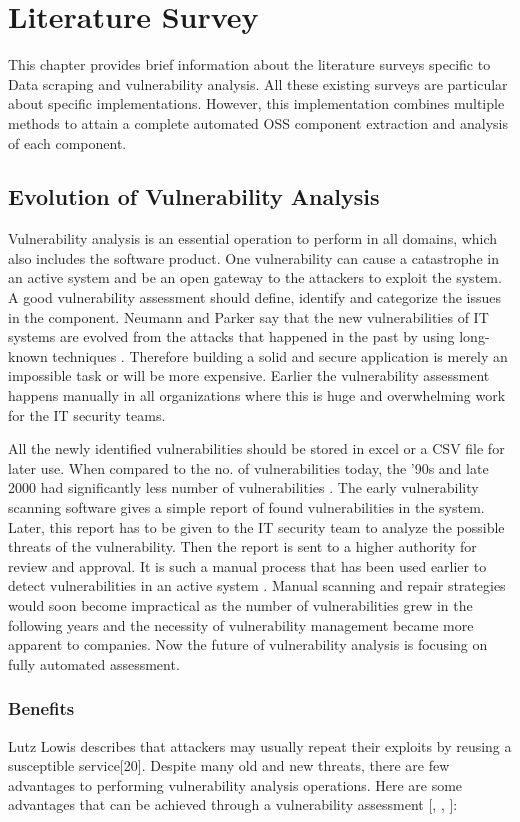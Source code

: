 %
\section{Literature Survey}\label{sec:literature survey}
%
This chapter provides brief information about the literature surveys specific to Data scraping and vulnerability analysis. All these existing surveys are particular about specific implementations. However, this implementation combines multiple methods to attain a complete automated OSS component extraction and analysis of each component.
%
\subsection{Evolution of Vulnerability Analysis}
Vulnerability analysis is an essential operation to perform in all domains, which also includes the software product. One vulnerability can cause a catastrophe in an active system and be an open gateway to the attackers to exploit the system. A good vulnerability assessment should define, identify and categorize the issues in the component\cite{LinRo2021}. 
Neumann and Parker say that the new vulnerabilities of IT systems are evolved from the attacks that happened in the past by using long-known techniques \cite{NePa1989}. Therefore building a solid and secure application is merely an impossible task or will be more expensive. Earlier the vulnerability assessment happens manually in all organizations where this is huge and overwhelming work for the IT security teams. 

All the newly identified vulnerabilities should be stored in excel or a CSV file for later use. When compared to the no. of vulnerabilities today, the ’90s and late 2000 had significantly less number of vulnerabilities \cite{Rh2019}. The early vulnerability scanning software gives a simple report of found vulnerabilities in the system. Later, this report has to be given to the IT security team to analyze the possible threats of the vulnerability. Then the report is sent to a higher authority for review and approval. It is such a manual process that has been used earlier to detect vulnerabilities in an active system \cite{Rh2019}. Manual scanning and repair strategies would soon become impractical as the number of vulnerabilities grew in the following years and the necessity of vulnerability management became more apparent to companies. Now the future of vulnerability analysis is focusing on fully automated assessment.
\subsubsection{Benefits}
Lutz Lowis describes that attackers may usually repeat their exploits by reusing a susceptible service[20]. Despite many old and new threats, there are few advantages to performing vulnerability analysis operations. Here are some advantages that can be achieved through a vulnerability assessment [\cite{LoAc2011}, \cite{Rh2019}, \cite{VulTest}]:

